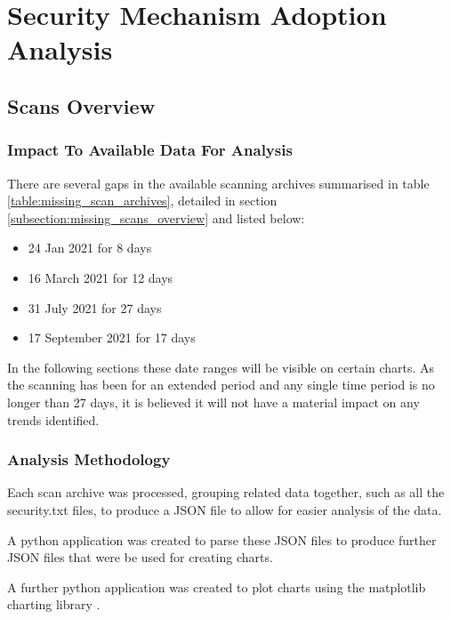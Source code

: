 \documentclass{mscreport}
\begin{document}
\chapter{Security Mechanism Adoption Analysis}
\label{chap:analysis}

\section{Scans Overview}
\label{section:scans_overview}

\subsection{Impact To Available Data For Analysis}

There are several gaps in the available scanning archives summarised in table \ref{table:missing_scan_archives}, detailed in section \ref{subsection:missing_scans_overview} and listed below:

\begin{itemize}
	\setlength\itemsep{0.1em}
    \item 24 Jan 2021 for 8 days
    \item 16 March 2021 for 12 days
    \item 31 July 2021 for 27 days
    \item 17 September 2021 for 17 days
\end{itemize}

\noindent
In the following sections these date ranges will be visible on certain charts. As the scanning has been for an extended period and any single time period is no longer than 27 days, it is believed it will not have a material impact on any trends identified.


\subsection{Analysis Methodology}

Each scan archive was processed, grouping related data together, such as all the security.txt files, to produce a JSON file to allow for easier analysis of the data.

\vspace{0.3cm} \noindent
A python application was created to parse these JSON files to produce further JSON files that were be used for creating charts.

\vspace{0.3cm} \noindent
A further python application was created to plot charts using the matplotlib charting library \cite{noauthor_undated-po}.
\end{document}
